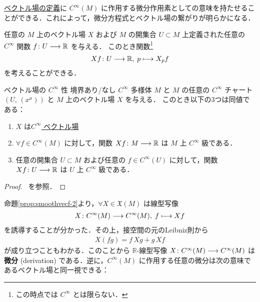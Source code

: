 \documentclass[TQFT_main]{subfiles}
\begin{document}
\hyperref[def:vecf]{ベクトル場の定義}に $C^\infty (M)$ に作用する微分作用素としての意味を持たせることができる．これによって，微分方程式とベクトル場の繋がりが明らかになる．

任意の $M$ 上のベクトル場 $X$ および $M$ の開集合 $U \subset M$ 上定義された任意の $C^\infty$ 関数 $f \colon U \longrightarrow \mathbb{R}$ を与える．
このとき関数\footnote{この時点では $C^\infty$ とは限らない．}
\begin{align}
    Xf \colon U \longrightarrow \mathbb{R},\; p \longmapsto X_p f
\end{align}
を考えることができる．

\begin{myprop}[label=prop:smoothvecf-2]{ベクトル場の $C^\infty$ 性}
    境界あり/なし $C^\infty$ 多様体 $M$ と $M$ の任意の $C^\infty$ チャート $(U,\, (x^\mu))$ と $M$ 上のベクトル場 $X$ を与える．
    このとき以下の3つは同値である：
    \begin{enumerate}
        \item $X$ は\hyperref[def:vecf]{$C^\infty$ ベクトル場}
        \item $\forall f \in C^\infty (M)$ に対して，関数 $Xf \colon M \longrightarrow \mathbb{R}$ は $M$ 上 $C^\infty$ 級である．
        \item 任意の開集合 $U \subset M$ および任意の $f \in C^\infty (U)$ に対して，関数 $Xf \colon U \longrightarrow \mathbb{R}$ は $U$ 上 $C^\infty$ 級である．
    \end{enumerate}
    
\end{myprop}

\begin{proof}
    ~\cite[p.180, Proposition 8.14]{Lee2012smooth}を参照．
\end{proof}

命題\ref{prop:smoothvecf-2}より，$\forall X \in \mathfrak{X}(M)$ は線型写像
\begin{align}
    X \colon C^\infty (M) \longrightarrow C^\infty(M),\; f \longmapsto Xf
\end{align}
を誘導することが分かった．その上，接空間の元のLeibniz則から
\begin{align}
    X(fg) = f\, Xg + g\, Xf
\end{align}
が成り立つこともわかる．このことから $\mathbb{R}$-線型写像 $X \colon C^\infty (M) \longrightarrow C^\infty(M)$ は\textbf{微分} (derivation) である．逆に，$C^\infty(M)$ に作用する任意の微分は次の意味であるベクトル場と同一視できる：
\end{document}
